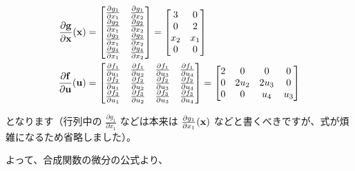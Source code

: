\begin{align*}
\frac{\partial {\bf g}}{\partial {\bf x}} ({\bf x})&=
\begin{bmatrix}
\frac{\partial g_1}{\partial x_1} & \frac{\partial g_1}{\partial x_2} \\
\frac{\partial g_2}{\partial x_1} & \frac{\partial g_2}{\partial x_2} \\
\frac{\partial g_3}{\partial x_1} & \frac{\partial g_3}{\partial x_2} \\
\frac{\partial g_4}{\partial x_1} & \frac{\partial g_4}{\partial x_2}
\end{bmatrix} =
\begin{bmatrix}
3 & 0 \\
0 & 2 \\
x_2 & x_1 \\
0 & 0
\end{bmatrix}\\
\frac{\partial {\bf f}}{\partial {\bf u}} ({\bf u})&=
\begin{bmatrix}
\frac{\partial f_1}{\partial u_1} & \frac{\partial f_1}{\partial u_2} & \frac{\partial f_1}{\partial u_3} & \frac{\partial f_1}{\partial u_4}\\
\frac{\partial f_2}{\partial u_1} & \frac{\partial f_2}{\partial u_2} & \frac{\partial f_2}{\partial u_3} & \frac{\partial f_2}{\partial u_4}\\
\frac{\partial f_3}{\partial u_1} & \frac{\partial f_3}{\partial u_2} & \frac{\partial f_3}{\partial u_3} & \frac{\partial f_3}{\partial u_4}\\
\end{bmatrix} =
\begin{bmatrix}
2 & 0 & 0 & 0\\
0 & 2u_2 & 2u_3 & 0 \\
0 & 0 & u_4 & u_3
\end{bmatrix}
\end{align*}


となります（行列中の $\frac{\partial g_1}{\partial x_1}$ などは本来は $\frac{\partial g_1}{\partial x_1}({\bf x})$ などと書くべきですが、式が煩雑になるため省略しました）。

よって、合成関数の微分の公式より、


